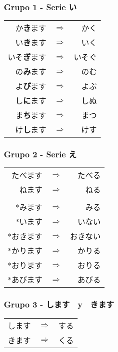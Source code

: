 \documentclass[a4paper,12pt,oneside]{report}
\def\then{$\Longrightarrow$}
\begin{document}
\begin{CJK*}{UTF8}{min}
      \subsubsection{Grupo 1 - Serie い}
        \begin{tabular}{rcr}
          か\textbf{き}ます & \then & かく \\
          い\textbf{き}ます & \then & いく \\
          いそ\textbf{ぎ}ます & \then & いそぐ \\
          の\textbf{み}ます & \then & のむ \\
          よ\textbf{び}ます & \then & よぶ \\
          し\textbf{に}ます & \then & しぬ \\
          ま\textbf{ち}ます & \then & まつ \\
          け\textbf{し}ます & \then & けす \\
        \end{tabular}

      \subsubsection{Grupo 2 - Serie え}
        \begin{tabular}{rcr}
          たべます & \then & たべる \\
          ねます & \then & ねる \\
          &&\\
          $*$みます & \then & みる \\
          $*$います & \then & いない \\
          $*$おきます & \then & おきない \\
          $*$かります & \then & かりる \\
          $*$おります & \then & おりる \\
          $*$あびます & \then & あびる \\
        \end{tabular}

      \subsubsection{Grupo 3 - します　y　きます}
        \begin{tabular}{rcr}
          します & \then & する \\
          きます & \then & くる \\
        \end{tabular}


\end{CJK*}
\end{document}
